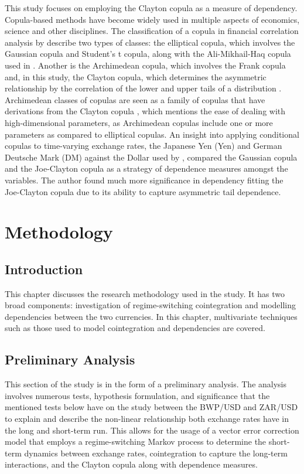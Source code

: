 \documentclass[a4paper]{article}
\theoremstyle{plain}
\theoremstyle{definition}
\theoremstyle{remark}
\begin{document}
This study focuses on employing the Clayton copula as a measure of dependency. Copula-based methods have become widely used in multiple aspects of economics, science and other disciplines. The classification of a copula in financial correlation analysis by \cite{LIU2020106808} describe two types of classes: the elliptical copula, which involves the Gaussian copula and Student's t copula, along with the Ali-Mikhail-Haq copula used in \cite{molefe2020roads}. Another is the Archimedean copula, which involves the Frank copula and, in this study, the Clayton copula, which determines the asymmetric relationship by the correlation of the lower and upper tails of a distribution \citep{LIU2020106808}. Archimedean classes of copulas are seen as a family of copulas that have derivations from the Clayton copula \citep{wang2010copula}, which mentions the ease of dealing with high-dimensional parameters, as Archimedean copulas include one or more parameters as compared to elliptical copulas. An insight into applying conditional copulas to time-varying exchange rates, the Japanese Yen (Yen) and German Deutsche Mark (DM) against the Dollar used by \cite{patton2001modelling}, compared the Gaussian copula and the Joe-Clayton copula as a strategy of dependence measures amongst the variables. The author found much more significance in dependency fitting the Joe-Clayton copula due to its ability to capture asymmetric tail dependence.

\section{Methodology}\label{meth}

\subsection{Introduction} 
This chapter discusses the research methodology used in the study. It has two broad components: investigation of regime-switching cointegration and modelling dependencies between the two currencies. In this chapter, multivariate techniques such as those used to model cointegration and dependencies are covered.

\subsection{Preliminary Analysis}\label{pre}
This section of the study is in the form of a preliminary analysis. The analysis involves numerous tests, hypothesis formulation, and significance that the mentioned tests below have on the study between the BWP/USD and ZAR/USD to explain and describe the non-linear relationship both exchange rates have in the long and short-term run. This allows for the usage of a vector error correction model that employs a regime-switching Markov process to determine the short-term dynamics between exchange rates, cointegration to capture the long-term interactions, and the Clayton copula along with dependence measures. 
\end{document}
